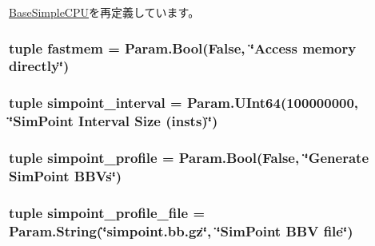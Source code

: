 \hyperlink{classBaseSimpleCPU_1_1BaseSimpleCPU_a17da7064bc5c518791f0c891eff05fda}{BaseSimpleCPU}を再定義しています。\hypertarget{classAtomicSimpleCPU_1_1AtomicSimpleCPU_ad79207d0fee050d6bbab51940ecf5af4}{
\subsubsection[{fastmem}]{\setlength{\rightskip}{0pt plus 5cm}tuple {\bf fastmem} = Param.Bool(False, \char`\"{}Access memory directly\char`\"{})}}
\label{classAtomicSimpleCPU_1_1AtomicSimpleCPU_ad79207d0fee050d6bbab51940ecf5af4}
\hypertarget{classAtomicSimpleCPU_1_1AtomicSimpleCPU_a5337086882522ee045e8a0d0399f5ce0}{
\subsubsection[{simpoint\_\-interval}]{\setlength{\rightskip}{0pt plus 5cm}tuple {\bf simpoint\_\-interval} = Param.UInt64(100000000, \char`\"{}SimPoint Interval Size (insts)\char`\"{})}}
\label{classAtomicSimpleCPU_1_1AtomicSimpleCPU_a5337086882522ee045e8a0d0399f5ce0}
\hypertarget{classAtomicSimpleCPU_1_1AtomicSimpleCPU_adf636be6d74dd1575256658761a69c35}{
\subsubsection[{simpoint\_\-profile}]{\setlength{\rightskip}{0pt plus 5cm}tuple {\bf simpoint\_\-profile} = Param.Bool(False, \char`\"{}Generate SimPoint BBVs\char`\"{})}}
\label{classAtomicSimpleCPU_1_1AtomicSimpleCPU_adf636be6d74dd1575256658761a69c35}
\hypertarget{classAtomicSimpleCPU_1_1AtomicSimpleCPU_ae342ee94ddfeda5ab3d190d419aeb920}{
\subsubsection[{simpoint\_\-profile\_\-file}]{\setlength{\rightskip}{0pt plus 5cm}tuple {\bf simpoint\_\-profile\_\-file} = Param.String(\char`\"{}simpoint.bb.gz\char`\"{}, \char`\"{}SimPoint BBV file\char`\"{})}}
